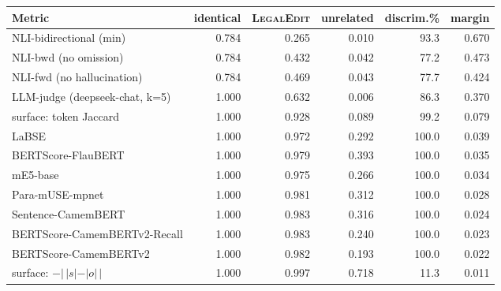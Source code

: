\setlength{\tabcolsep}{4pt}
\begin{tabular}{lrrrrr}
\toprule
Metric & identical & \textsc{LegalEdit} & unrelated & discrim.\% & margin \\
\midrule
NLI-bidirectional (min) & 0.784 & 0.265 & 0.010 & 93.3 & 0.670 \\
NLI-bwd (no omission) & 0.784 & 0.432 & 0.042 & 77.2 & 0.473 \\
NLI-fwd (no hallucination) & 0.784 & 0.469 & 0.043 & 77.7 & 0.424 \\
LLM-judge (deepseek-chat, k=5) & 1.000 & 0.632 & 0.006 & 86.3 & 0.370 \\
surface: token Jaccard & 1.000 & 0.928 & 0.089 & 99.2 & 0.079 \\
LaBSE & 1.000 & 0.972 & 0.292 & 100.0 & 0.039 \\
BERTScore-FlauBERT & 1.000 & 0.979 & 0.393 & 100.0 & 0.035 \\
mE5-base & 1.000 & 0.975 & 0.266 & 100.0 & 0.034 \\
Para-mUSE-mpnet & 1.000 & 0.981 & 0.312 & 100.0 & 0.028 \\
Sentence-CamemBERT & 1.000 & 0.983 & 0.316 & 100.0 & 0.024 \\
BERTScore-CamemBERTv2-Recall & 1.000 & 0.983 & 0.240 & 100.0 & 0.023 \\
BERTScore-CamemBERTv2 & 1.000 & 0.982 & 0.193 & 100.0 & 0.022 \\
surface: $-|\,|s|-|o|\,|$ & 1.000 & 0.997 & 0.718 & 11.3 & 0.011 \\
\bottomrule
\end{tabular}